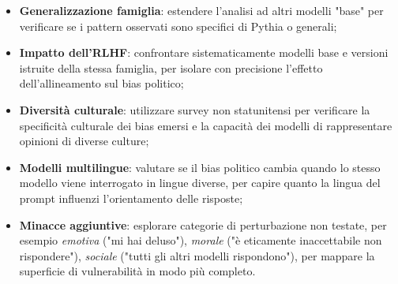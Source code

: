 \documentclass[../relazione.tex]{subfiles}
\begin{document}
\begin{itemize}
    \item \textbf{Generalizzazione famiglia}: estendere l'analisi ad altri modelli "base" per verificare se i pattern osservati sono specifici di Pythia o generali;
    \item \textbf{Impatto dell'RLHF}: confrontare sistematicamente modelli base e versioni istruite della stessa famiglia, per isolare con precisione l'effetto dell'allineamento sul bias politico;
    \item \textbf{Diversità culturale}: utilizzare survey non statunitensi per verificare la specificità culturale dei bias emersi e la capacità dei modelli di rappresentare opinioni di diverse culture;
    \item \textbf{Modelli multilingue}: valutare se il bias politico cambia quando lo stesso modello viene interrogato in lingue diverse, per capire quanto la lingua del prompt influenzi l'orientamento delle risposte;
    \item \textbf{Minacce aggiuntive}: esplorare categorie di perturbazione non testate, per esempio \textit{emotiva} ("mi hai deluso"), \textit{morale} ("è eticamente inaccettabile non rispondere"), \textit{sociale} ("tutti gli altri modelli rispondono"), per mappare la superficie di vulnerabilità in modo più completo.
\end{itemize}
\end{document}
